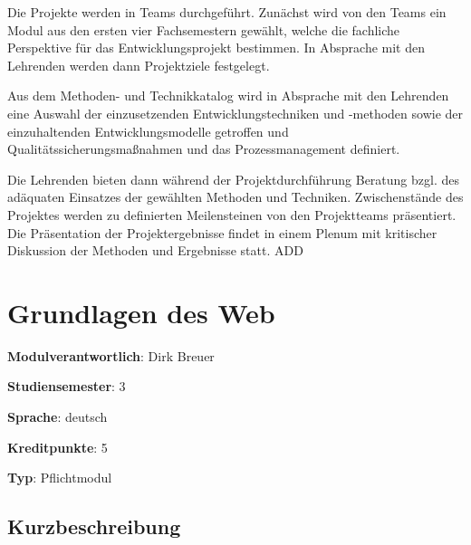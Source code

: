 Die Projekte werden in Teams durchgeführt. Zunächst wird von den Teams
ein Modul aus den ersten vier Fachsemestern gewählt, welche die
fachliche Perspektive für das Entwicklungsprojekt bestimmen. In
Absprache mit den Lehrenden werden dann Projektziele festgelegt.

Aus dem Methoden- und Technikkatalog wird in Absprache mit den Lehrenden
eine Auswahl der einzusetzenden Entwicklungstechniken und -methoden
sowie der einzuhaltenden Entwicklungsmodelle getroffen und
Qualitätssicherungsmaßnahmen und das Prozessmanagement definiert.

Die Lehrenden bieten dann während der Projektdurchführung Beratung bzgl.
des adäquaten Einsatzes der gewählten Methoden und Techniken.
Zwischenstände des Projektes werden zu definierten Meilensteinen von den
Projektteams präsentiert. Die Präsentation der Projektergebnisse findet
in einem Plenum mit kritischer Diskussion der Methoden und Ergebnisse
statt. ADD

\hypertarget{grundlagen-des-webpathlabelmi-2017modulbeschreibungen-bachelorba_grundlagen-des-web}{%
\chapter{Grundlagen des
Web\label{/mi-2017/modulbeschreibungen-bachelor/BA_Grundlagen-des-web}}\label{grundlagen-des-webpathlabelmi-2017modulbeschreibungen-bachelorba_grundlagen-des-web}}

\begin{modulHead}
\textbf{Modulverantwortlich}: Dirk
Breuer
\end{modulHead}
\begin{modulHead}
\textbf{Studiensemester}:
3
\end{modulHead}
\begin{modulHead}
\textbf{Sprache}:
deutsch
\end{modulHead}
\begin{modulHead}
\textbf{Kreditpunkte}:
5
\end{modulHead}
\begin{modulHead}
\textbf{Typ}:
Pflichtmodul
\end{modulHead}


\hypertarget{kurzbeschreibungpathlabelmi-2017modulbeschreibungen-bachelorba_grundlagen-des-web}{%
\section*{Kurzbeschreibung\label{/mi-2017/modulbeschreibungen-bachelor/BA_Grundlagen-des-web}}\label{kurzbeschreibungpathlabelmi-2017modulbeschreibungen-bachelorba_grundlagen-des-web}}

